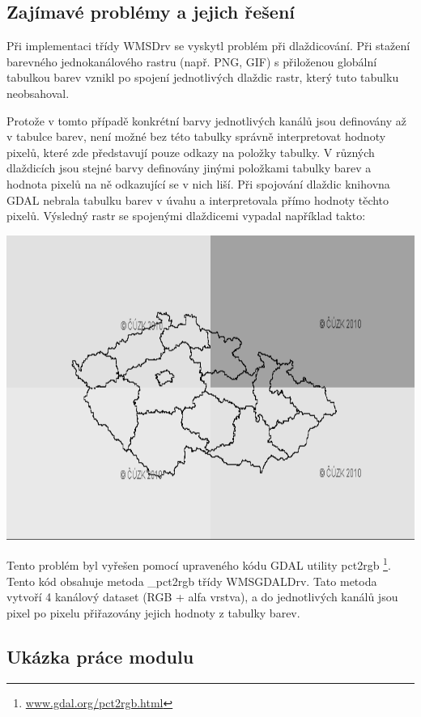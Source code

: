 \documentclass[a4paper,12pt]{article}
\begin{document}
\subsection{Zajímavé problémy a jejich řešení}

Při implementaci třídy WMSDrv se vyskytl problém při dlaždicování.
Při stažení barevného jednokanálového rastru (např. PNG, GIF) s
přiloženou globální tabulkou barev vznikl po spojení jednotlivých
dlaždic rastr, který tuto tabulku neobsahoval.

Protože v tomto případě konkrétní barvy jednotlivých kanálů jsou
definovány až v tabulce barev, není možné bez této tabulky správně
interpretovat hodnoty pixelů, které zde představují pouze odkazy na
položky tabulky. V různých dlaždicích jsou stejné barvy definovány
jinými položkami tabulky barev a hodnota pixelů na ně odkazující se v
nich liší.  Při spojování dlaždic knihovna GDAL nebrala tabulku barev
v úvahu a interpretovala přímo hodnoty těchto pixelů. Výsledný rastr
se spojenými dlaždicemi vypadal například takto:

 \includegraphics[scale=0.4]{figures/color_table_problem.png}

Tento problém byl vyřešen pomocí upraveného kódu GDAL utility
pct2rgb \footnote{\url{www.gdal.org/pct2rgb.html}}. Tento kód obsahuje
metoda \_pct2rgb třídy WMSGDALDrv.  Tato metoda vytvoří 4 kanálový
dataset (RGB + alfa vrstva), a do jednotlivých kanálů jsou pixel po
pixelu přiřazovány jejich hodnoty z tabulky barev.

\subsection{Ukázka práce modulu}
\end{document}
